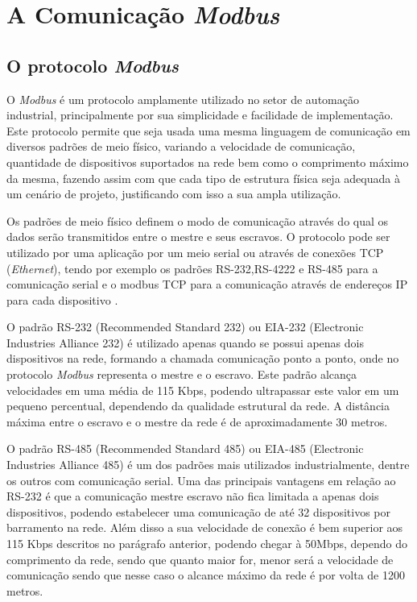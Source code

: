 \chapter{A Comunicação \textit{Modbus}}
\label{c:a_comunicacao_modbus}
\section{O protocolo \textit{Modbus}}

O \textit{Modbus} é um protocolo amplamente utilizado no setor de automação industrial, principalmente por sua simplicidade e facilidade de implementação. Este protocolo permite que seja usada uma mesma linguagem de comunicação em diversos padrões de meio físico, variando a velocidade de comunicação, quantidade de dispositivos suportados na rede bem como o comprimento máximo da mesma, fazendo assim com que cada tipo de estrutura física seja adequada à um cenário de projeto, justificando com isso a sua ampla utilização.

Os padrões de meio físico definem o modo de comunicação através do qual os dados serão transmitidos entre o mestre e seus escravos. O protocolo pode ser utilizado por uma aplicação por um meio serial ou através de conexões TCP (\textit{Ethernet}), tendo por exemplo os padrões RS-232,RS-4222 e RS-485 para a comunicação serial e o modbus TCP para a comunicação através de endereços IP para cada dispositivo \cite{dutertre2007formal}.

O padrão RS-232 (Recommended Standard 232) ou EIA-232 (Electronic Industries Alliance 232) é utilizado apenas quando se possui apenas dois dispositivos na rede, formando a chamada comunicação ponto a ponto,  onde no protocolo \textit{Modbus} representa o mestre e o escravo. Este padrão alcança velocidades em uma média de 115 Kbps, podendo ultrapassar este valor em um pequeno percentual, dependendo da qualidade estrutural da rede. A distância máxima entre o escravo e o mestre da rede é de aproximadamente 30 metros.

O padrão RS-485 (Recommended Standard 485) ou EIA-485 (Electronic Industries Alliance 485) é um dos padrões mais utilizados industrialmente, dentre os outros com comunicação serial. Uma das principais vantagens em relação ao RS-232 é que a comunicação mestre escravo não fica limitada a apenas dois dispositivos, podendo estabelecer uma comunicação de até 32 dispositivos por barramento na rede. Além disso a sua velocidade de conexão é bem superior aos 115 Kbps descritos no parágrafo anterior, podendo chegar à 50Mbps, dependo do comprimento da rede, sendo que quanto maior for, menor será a velocidade de comunicação sendo que nesse caso o alcance máximo da rede é por volta de 1200 metros.


